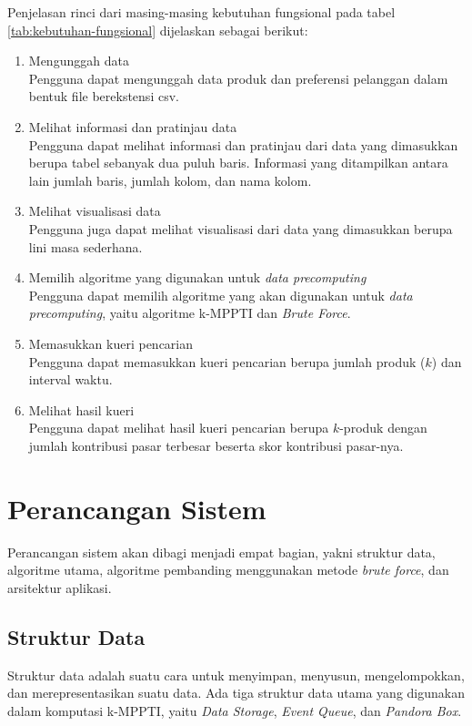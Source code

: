 Penjelasan rinci dari masing-masing kebutuhan fungsional pada tabel \ref{tab:kebutuhan-fungsional} dijelaskan sebagai berikut:
\begin{enumerate}
	\item Mengunggah data\\
	Pengguna dapat mengunggah data produk dan preferensi pelanggan dalam bentuk file berekstensi csv.
	\item Melihat informasi dan pratinjau data \\
	Pengguna dapat melihat informasi dan pratinjau dari data yang dimasukkan berupa tabel sebanyak dua puluh baris. Informasi yang ditampilkan antara lain jumlah baris, jumlah kolom, dan nama kolom.
	\item Melihat visualisasi data \\
	Pengguna juga dapat melihat visualisasi dari data yang dimasukkan berupa lini masa sederhana.
	\item Memilih algoritme yang digunakan untuk \textit{data precomputing} \\
	Pengguna dapat memilih algoritme yang akan digunakan untuk \textit{data precomputing}, yaitu algoritme k-MPPTI dan \textit{Brute Force}.
	\item Memasukkan kueri pencarian \\
	Pengguna dapat memasukkan kueri pencarian berupa jumlah produk ($k$) dan interval waktu.
	\item Melihat hasil kueri \\
	Pengguna dapat melihat hasil kueri pencarian berupa $k$-produk dengan jumlah kontribusi pasar terbesar beserta skor kontribusi pasar-nya. 
\end{enumerate}

\section{Perancangan Sistem}
\tab Perancangan sistem akan dibagi menjadi empat bagian, yakni struktur data, algoritme utama, algoritme pembanding menggunakan metode \textit{brute force}, dan arsitektur aplikasi. 

\subsection{Struktur Data}
\tab Struktur data adalah suatu cara untuk menyimpan, menyusun, mengelompokkan, dan merepresentasikan suatu data. Ada tiga struktur data utama yang digunakan dalam komputasi k-MPPTI, yaitu \textit{Data Storage}, \textit{Event Queue}, dan \textit{Pandora Box}.

